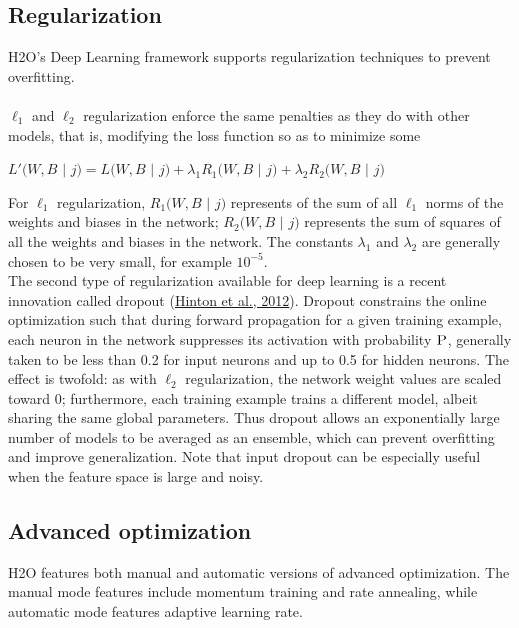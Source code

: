 \documentclass[11pt]{article}
\begin{document}
\subsection{Regularization} \label{2.3}
H2O's Deep Learning framework supports regularization techniques to prevent overfitting. 
\\
\\
$\ell_1$ and $\ell_2$ regularization enforce the same penalties as they do with other models, that is, modifying the loss function so as to minimize some
\\
\begin{center}
$L'(W,B$ $|$ $j) = L(W,B$ $|$ $j) + \lambda_1 R_1(W,B$ $|$ $j) + \lambda_2 R_2(W,B$ $|$ $j)$
\end{center}

For $\ell_1$ regularization, $R_1(W,B$ $|$ $j)$ represents of the sum of all $\ell_1$ norms of the weights and biases in the network; $R_2(W,B$ $|$ $j)$ represents the sum of squares of all the weights and biases in the network. The constants $\lambda_1$ and $\lambda_2$ are generally chosen to be very small, for example $10^{-5}$.
\\
The second type of regularization available for deep learning is a recent innovation called dropout (\href{http://arxiv.org/pdf/1207.0580.pdf}{Hinton et al., 2012}). Dropout constrains the online optimization such that during forward propagation for a given training example, each neuron in the network suppresses its activation with probability $\textsc{P}$, generally taken to be less than 0.2 for input neurons and up to 0.5 for hidden neurons. The effect is twofold: as with $\ell_2$ regularization, the network weight values are scaled toward 0; furthermore, each training example trains a different model, albeit sharing the same global parameters. Thus dropout allows an exponentially large number of models to be averaged as an ensemble, which can prevent overfitting and improve generalization. Note that input dropout can be especially useful when the feature space is large and noisy.

\subsection{Advanced optimization} \label{2.4}
H2O features both manual and automatic versions of advanced optimization. The manual mode features include momentum training and rate annealing, while automatic mode features adaptive learning rate.
\end{document}
